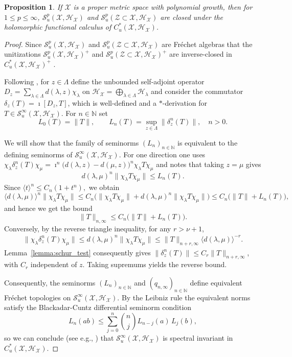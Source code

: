 \documentclass[12pt]{amsart}
\newtheorem{proposition}[theorem]{Proposition}
\newcommand{\NM}{{\mathbb N}}
\newcommand{\Ss}{{\mathcal S}}
\newcommand{\Hh}{{\mathcal H}}
\newcommand{\Xx}{{\mathcal X}}
\newcommand{\Zz}{{\mathcal Z}}
\begin{document}
\begin{proposition}\label{prop:spectral_invariance}
If $\Xx$ is a proper metric space with polynomial growth, then for $1 \leq p \leq \infty$, $\Ss^p_u(\Xx, \Hh_\Xx)$ and $\Ss^p_u(\Zz\subset\Xx, \Hh_\Xx)$ are closed under the holomorphic functional calculus of $C_u^*(\Xx, \Hh_\Xx)$.
\end{proposition}
\begin{proof}
Since $\Ss^p_u(\Xx, \Hh_\Xx)$ and $\Ss^p_u(\Zz\subset\Xx, \Hh_\Xx)$ are Fr\'echet algebras that the unitizations $\Ss^p_u(\Xx, \Hh_\Xx)^+$ and $\Ss^p_u(\Zz\subset\Xx, \Hh_\Xx)^+$ are inverse-closed in $C^*_u(\Xx, \Hh_\Xx)^+$ \cite{Schweitzer1992}.

Following \cite{JiYu2020UniformRoeRD}, for $z\in\Lambda$ define the unbounded self-adjoint operator $D_z=\sum_{\lambda\in\Lambda}d(\lambda,z)\chi_\lambda$
on $\Hh_\Xx=\bigoplus_{\lambda\in\Lambda}\Hh_\lambda$ and consider the commutator $\delta_z(T)=\imath[D_z,T]$, which is well-defined and a $*$-derivation for $T\in \Ss^\infty_u(\Xx,\Hh_\Xx)$. 
For $n\in\NM$ set
\[L_0(T)=\|T\|,  \qquad L_n(T)=\sup_{z\in\Lambda}\|\delta_z^n(T)\|, \quad n>0.\]

We will show that the family of seminorms $(L_n)_{n\in \NM}$ is equivalent to the defining seminorms of $\Ss^\infty_u(\Xx, \Hh_\Xx)$. For one direction one uses $\chi_\lambda\delta_z^n(T)\chi_\mu= \imath^n \bigl(d(\lambda,z)-d(\mu,z)\bigr)^n\chi_\lambda T\chi_\mu$ and notes that taking $z=\mu$ gives
\[d(\lambda,\mu)^n \|\chi_\lambda T\chi_\mu\| \leq L_n(T).\]
Since $\langle t\rangle^n \leq C_n(1+t^n),$
we obtain
\[\langle d(\lambda,\mu)\rangle^n
\|\chi_\lambda T\chi_\mu\|\leq C_n\bigl(\|\chi_\lambda T\chi_\mu\| + d(\lambda,\mu)^n \|\chi_\lambda T\chi_\mu\| \bigr) \leq C_n\bigl(\|T\|+L_n(T)\bigr),\]
and hence we get the bound
\[\|T\|_{n,\infty} \leq C_n \bigl(\|T\|+L_n(T)\bigr).\]
Conversely, by the reverse triangle inequality, for any $r>\nu+1$, 
\begin{align*}
\|\chi_\lambda\delta_z^n(T)\chi_\mu\| \leq
d(\lambda,\mu)^n
\|\chi_\lambda T\chi_\mu\|\leq
\|T\|_{n+r,\infty}
\langle d(\lambda,\mu)\rangle^{-r}.
\end{align*}
Lemma~\ref{lemma:schur_test} consequently gives $\|\delta_z^n(T)\| \leq C_r\|T\|_{n+r,\infty}$, with $C_r$ independent of $z$.
Taking supremums yields the reverse bound.


Consequently, the seminorms $(L_n)_{n\in\NM}$ and
$(q_{n,\infty})_{n\in\NM}$ define equivalent Fr\'echet topologies on
$\Ss_u^{\infty}(\Xx,\Hh_\Xx)$. By the Leibniz rule the equivalent norms satisfy the Blackadar-Cuntz differential seminorm condition
$$L_n(ab)\leq \sum_{j=0}^n \binom{n}{j} L_{n-j}(a)\, L_j(b),$$ so we can conclude (see e.g., \cite{Schweitzer1993SpectralInvariance}) that $\Ss_u^\infty(\Xx,\Hh_\Xx)$ is spectral invariant in $C^*_u(\Xx,\Hh_\Xx)$.


\end{proof}
\end{document}
